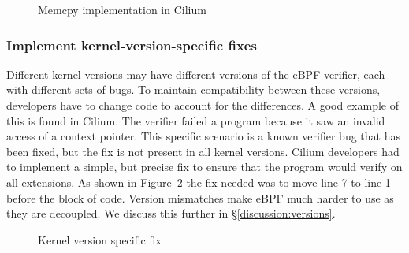 \begin{figure}
    
    \caption{Memcpy implementation in Cilium}
    \label{fig:cilium-memcpy}
\end{figure}

\subsubsection{Implement kernel-version-specific fixes}
\label{motivation:kernel-version}
Different kernel versions may have different versions of the eBPF verifier, each with different sets of bugs.
To maintain compatibility between these versions, developers have to change code to account for the differences.
A good example of this is found in Cilium.
The verifier failed a program because it saw an invalid access of a context pointer.
This specific scenario is a known verifier bug that has been fixed, but the fix is not present in all kernel versions.
Cilium developers had to implement a simple, but precise fix to ensure that the program would verify on all extensions.
As shown in Figure~\ref{fig:kernel-version-code} the fix needed was to move line 7 to line 1 before the block of code.
Version mismatches make eBPF much harder to use as they are decoupled.
We discuss this further in \S\ref{discussion:versions}.


\begin{figure}
    
    \caption{Kernel version specific fix}
    \label{fig:kernel-version-code}
\end{figure}

